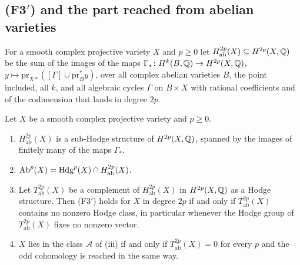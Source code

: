 \subsection{(F3$'$) and the part reached from abelian varieties}
\label{ssec:abpart}

\begin{definition}\label{def:abpart}
For a smooth complex projective variety $X$ and $p\ge0$ let
$H^{2p}_{\mathrm{ab}}(X)\subseteq H^{2p}(X,\mathbb{Q})$ be the sum of the images of
the maps
$\Gamma_{*}\colon H^{k}(B,\mathbb{Q})\to H^{2p}(X,\mathbb{Q})$,
$y\mapsto\mathrm{pr}_{X*}([\Gamma]\cup\mathrm{pr}_{B}^{*}y)$, over all
complex abelian varieties $B$, the point included, all $k$, and all algebraic
cycles $\Gamma$ on $B\times X$ with rational coefficients and of the
codimension that lands in degree $2p$.
\end{definition}

\begin{proposition}\label{prop:abpart}
Let $X$ be a smooth complex projective variety and $p\ge0$.
\begin{enumerate}[label=\textup{(\roman*)},leftmargin=2.6em,itemsep=2pt]
\item $H^{2p}_{\mathrm{ab}}(X)$ is a sub-Hodge structure of
  $H^{2p}(X,\mathbb{Q})$, spanned by the images of finitely many of the maps
  $\Gamma_{*}$.
\item $\mathrm{Ab}^{p}(X)=\mathrm{Hdg}^{p}(X)\cap H^{2p}_{\mathrm{ab}}(X)$.
\item Let $T^{2p}_{\mathrm{ab}}(X)$ be a complement of
  $H^{2p}_{\mathrm{ab}}(X)$ in $H^{2p}(X,\mathbb{Q})$ as a Hodge structure. Then
  \textup{(F3$'$)} holds for $X$ in degree $2p$ if and only if
  $T^{2p}_{\mathrm{ab}}(X)$ contains no nonzero Hodge class, in particular
  whenever the Hodge group of $T^{2p}_{\mathrm{ab}}(X)$ fixes no nonzero
  vector.
\item $X$ lies in the class $\mathcal{A}$ of (iii) if and
  only if $T^{2p}_{\mathrm{ab}}(X)=0$ for every $p$ and the odd cohomology is
  reached in the same way.
\end{enumerate}
\end{proposition}

